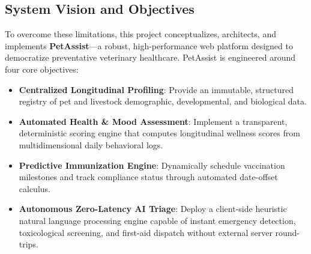 \documentclass[conference]{IEEEtran}
\begin{document}
\subsection{System Vision and Objectives}
To overcome these limitations, this project conceptualizes, architects, and implements \textbf{PetAssist}---a robust, high-performance web platform designed to democratize preventative veterinary healthcare. PetAssist is engineered around four core objectives:
\begin{itemize}
    \item \textbf{Centralized Longitudinal Profiling}: Provide an immutable, structured registry of pet and livestock demographic, developmental, and biological data.
    \item \textbf{Automated Health \& Mood Assessment}: Implement a transparent, deterministic scoring engine that computes longitudinal wellness scores from multidimensional daily behavioral logs.
    \item \textbf{Predictive Immunization Engine}: Dynamically schedule vaccination milestones and track compliance status through automated date-offset calculus.
    \item \textbf{Autonomous Zero-Latency AI Triage}: Deploy a client-side heuristic natural language processing engine capable of instant emergency detection, toxicological screening, and first-aid dispatch without external server round-trips.
\end{itemize}
\end{document}
